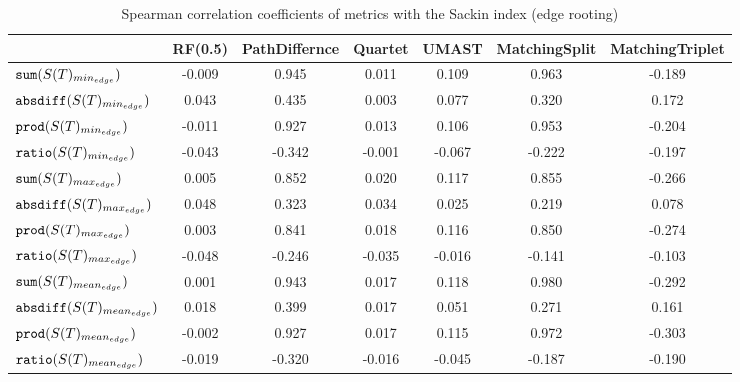 \begin{table}[h]
\centering
\caption{Spearman correlation coefficients of metrics with the Sackin index (edge rooting)}
\begin{tabular}{lcccccc}
 & RF(0.5) & PathDiffernce & Quartet & UMAST & MatchingSplit & MatchingTriplet \\
\hline
${\verb+sum+}(S(T)_{min_{edge}})$ & -0.009 & 0.945 & 0.011 & 0.109 & 0.963 & -0.189 \\
${\verb+absdiff+}(S(T)_{min_{edge}})$ & 0.043 & 0.435 & 0.003 & 0.077 & 0.320 & 0.172 \\
${\verb+prod+}(S(T)_{min_{edge}})$ & -0.011 & 0.927 & 0.013 & 0.106 & 0.953 & -0.204 \\
${\verb+ratio+}(S(T)_{min_{edge}})$ & -0.043 & -0.342 & -0.001 & -0.067 & -0.222 & -0.197 \\
${\verb+sum+}(S(T)_{max_{edge}})$ & 0.005 & 0.852 & 0.020 & 0.117 & 0.855 & -0.266 \\
${\verb+absdiff+}(S(T)_{max_{edge}})$ & 0.048 & 0.323 & 0.034 & 0.025 & 0.219 & 0.078 \\
${\verb+prod+}(S(T)_{max_{edge}})$ & 0.003 & 0.841 & 0.018 & 0.116 & 0.850 & -0.274 \\
${\verb+ratio+}(S(T)_{max_{edge}})$ & -0.048 & -0.246 & -0.035 & -0.016 & -0.141 & -0.103 \\
${\verb+sum+}(S(T)_{mean_{edge}})$ & 0.001 & 0.943 & 0.017 & 0.118 & 0.980 & -0.292 \\
${\verb+absdiff+}(S(T)_{mean_{edge}})$ & 0.018 & 0.399 & 0.017 & 0.051 & 0.271 & 0.161 \\
${\verb+prod+}(S(T)_{mean_{edge}})$ & -0.002 & 0.927 & 0.017 & 0.115 & 0.972 & -0.303 \\
${\verb+ratio+}(S(T)_{mean_{edge}})$ & -0.019 & -0.320 & -0.016 & -0.045 & -0.187 & -0.190 \\
\end{tabular}
\end{table}

